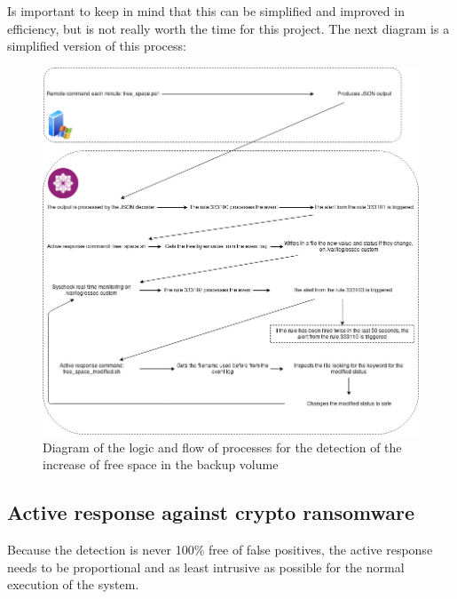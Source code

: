 \linej
Is important to keep in mind that this can be simplified and improved in efficiency, but is not really worth the time for this project.
\linej
The next diagram is a simplified version of this process:
\begin{figure}[H]
	\centering
	\includegraphics[width=\textwidth]{figuras/free_space_diagram.jpg}
	\caption{Diagram of the logic and flow of processes for the detection of the increase of free space in the backup volume}
\end{figure}


\subsection{Active response against crypto ransomware}
Because the detection is never 100\% free of false positives, the active response needs to be proportional and as least intrusive as possible for the normal execution of the system.



